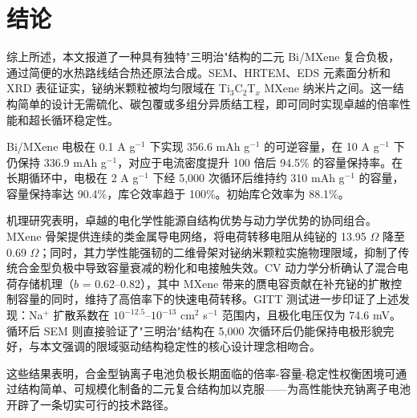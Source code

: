 \section{结论}

综上所述，本文报道了一种具有独特"三明治"结构的二元 Bi/MXene 复合负极，通过简便的水热路线结合热还原法合成。SEM、HRTEM、EDS 元素面分析和 XRD 表征证实，铋纳米颗粒被均匀限域在 Ti$_{3}$C$_{2}$T$_{x}$ MXene 纳米片之间。这一结构简单的设计无需硫化、碳包覆或多组分异质结工程，即可同时实现卓越的倍率性能和超长循环稳定性。

Bi/MXene 电极在 0.1 A g$^{-1}$ 下实现 356.6 mAh g$^{-1}$ 的可逆容量，在 10 A g$^{-1}$ 下仍保持 336.9 mAh g$^{-1}$，对应于电流密度提升 100 倍后 94.5\% 的容量保持率。在长期循环中，电极在 2 A g$^{-1}$ 下经 5,000 次循环后维持约 310 mAh g$^{-1}$ 的容量，容量保持率达 90.4\%，库仑效率趋于 100\%。初始库仑效率为 88.1\%。

机理研究表明，卓越的电化学性能源自结构优势与动力学优势的协同组合。MXene 骨架提供连续的类金属导电网络，将电荷转移电阻从纯铋的 13.95 $\Omega$ 降至 0.69 $\Omega$；同时，其力学性能强韧的二维骨架对铋纳米颗粒实施物理限域，抑制了传统合金型负极中导致容量衰减的粉化和电接触失效。CV 动力学分析确认了混合电荷存储机理（$b$ = 0.62--0.82），其中 MXene 带来的赝电容贡献在补充铋的扩散控制容量的同时，维持了高倍率下的快速电荷转移。GITT 测试进一步印证了上述发现：Na$^{+}$ 扩散系数在 $10^{-12.5}$--$10^{-13}$ cm$^{2}$ s$^{-1}$ 范围内，且极化电压仅为 74.6 mV。循环后 SEM 则直接验证了"三明治"结构在 5,000 次循环后仍能保持电极形貌完好，与本文强调的限域驱动结构稳定性的核心设计理念相吻合。

这些结果表明，合金型钠离子电池负极长期面临的倍率-容量-稳定性权衡困境可通过结构简单、可规模化制备的二元复合结构加以克服——为高性能快充钠离子电池开辟了一条切实可行的技术路径。
